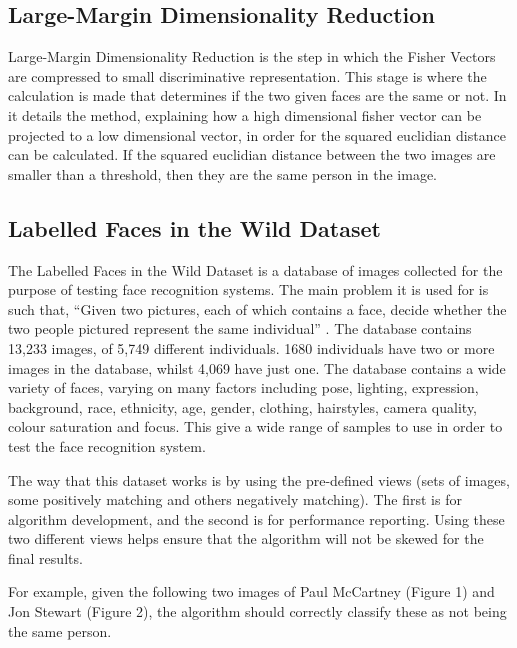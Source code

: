 \documentclass[12pt, a4paper]{article}
\begin{document}
\subsection{Large-Margin Dimensionality Reduction}

Large-Margin Dimensionality Reduction is the step in which the Fisher Vectors are compressed to small discriminative representation. This stage is where the calculation is made that determines if the two given faces are the same or not. In \cite{highlbpsift} it details the method, explaining how a high dimensional fisher vector can be projected to a low dimensional vector, in order for the squared euclidian distance can be calculated. If the squared euclidian distance between the two images are smaller than a threshold, then they are the same person in the image.
        
  \subsection{Labelled Faces in the Wild Dataset}

The Labelled Faces in the Wild Dataset is a database of images collected for the purpose of testing face recognition systems. The main problem it is used for is such that, “Given two pictures, each of which contains a face, decide whether the two people pictured represent the same individual” \cite{labelledFaces}. The database contains 13,233 images, of 5,749 different individuals. 1680 individuals have two or more images in the database, whilst 4,069 have just one. The database contains a wide variety of faces, varying on many factors including pose, lighting, expression, background, race, ethnicity, age, gender, clothing, hairstyles, camera quality, colour saturation and focus. This give a wide range of samples to use in order to test the face recognition system.

The way that this dataset works is by using the pre-defined views (sets of images, some positively matching and others negatively matching). The first is for algorithm development, and the second is for performance reporting. Using these two different views helps ensure that the algorithm will not be skewed for the final results.

For example, given the following two images of Paul McCartney (Figure 1) and Jon Stewart (Figure 2), the algorithm should correctly classify these as not being the same person. 
\end{document}
